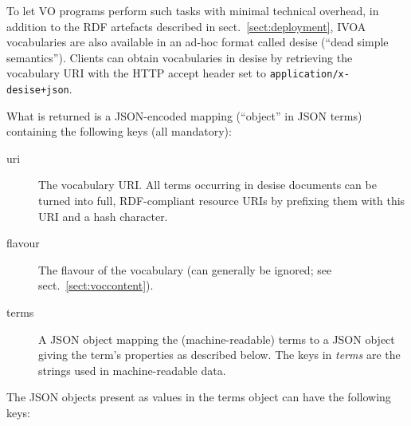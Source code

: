 \documentclass[11pt,a4paper]{ivoa}
\begin{document}
To let VO programs perform such tasks with minimal technical overhead,
in addition to the RDF artefacts described in
sect.~\ref{sect:deployment}, IVOA vocabularies are also available in an
ad-hoc format called desise (``dead simple semantics'').  Clients can
obtain vocabularies in desise by retrieving the vocabulary URI with the
HTTP accept header set to \texttt{application/x-desise+json}.

What is returned is a JSON-encoded \citep{std:JSON} mapping (``object''
in JSON terms)
containing the following keys (all mandatory):

\begin{description}
\item[uri] The vocabulary URI.  All terms occurring in desise documents
can be turned into full, RDF-compliant resource URIs by prefixing them
with this URI and a hash character.
\item[flavour] The flavour of the vocabulary (can generally be ignored;
see sect.~\ref{sect:voccontent}).

\item[terms] A JSON object mapping the (machine-readable) terms to a
JSON object giving the term's properties as described below.
The keys in \textit{terms} are the strings used in
machine-readable data.
\end{description}

The JSON objects present as values in the terms object can have the
following keys:
\end{document}
